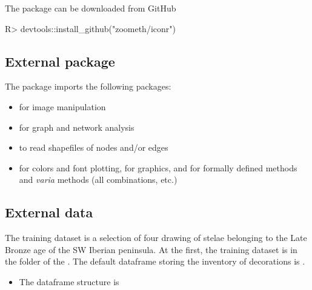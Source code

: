 \documentclass[article]{jss}
\begin{document}
The  package can be downloaded from GitHub
%
\begin{CodeChunk}
\begin{CodeInput}
R>   devtools::install_github("zoometh/iconr")
\end{CodeInput}
\end{CodeChunk}
%

\subsection{External package} \label{sec:ext_pck}

The  package imports the following packages:
\begin{itemize}
\setlength\itemsep{.1em}
  \item {} for image manipulation \citep{Ooms18}
  \item {} for graph and network analysis \citep{Csardi06} 
  \item {}  to read shapefiles of nodes and/or edges \citep{Bivand19}
  \item {} for colors and font plotting,  for graphics,  and  for formally defined methods and \emph{varia} methods (all combinations, etc.) \citep{R19}
\end{itemize}

\subsection{External data} \label{sec:ext_data}

The training dataset is a selection of four drawing of stelae belonging to the Late Bronze age of the SW Iberian peninsula. At the first, the training dataset is in the  folder of the . The default dataframe storing the inventory of decorations is .

\begin{itemize}
\item The  dataframe structure is
\end{itemize}
\end{document}
